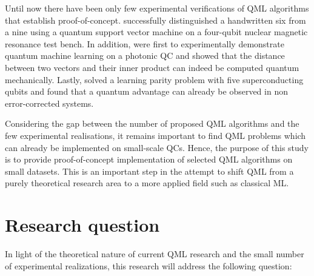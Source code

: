 Until now there have been only few experimental verifications of QML algorithms that establish proof-of-concept.  successfully distinguished a handwritten six from a nine using a quantum support vector machine on a four-qubit nuclear magnetic resonance test bench. In addition,  were first to experimentally demonstrate quantum machine learning on a photonic QC and showed that the distance between two vectors and their inner product can indeed be computed quantum mechanically. Lastly,  solved a learning parity problem with five superconducting qubits and found that a quantum advantage can already be observed in non error-corrected systems.

Considering the gap between the number of proposed QML algorithms and the few experimental realisations, it remains important to find QML problems which can already be implemented on small-scale QCs. Hence, the purpose of this study is to provide proof-of-concept implementation of selected QML algorithms on small datasets. This is an important step in the attempt to shift QML from a purely theoretical research area to a more applied field such as classical ML. 

\section{Research question}
\label{sec:researchquestion}






In light of the theoretical nature of current QML research and the small number of experimental realizations, this research will address the following question:

